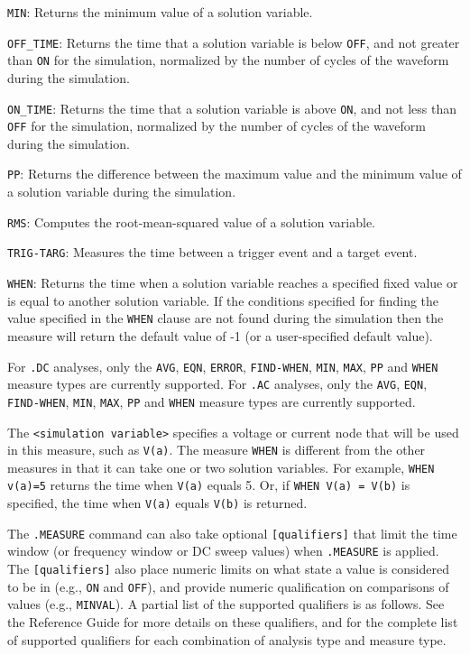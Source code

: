 \begin{XyceItemize}
  \item \texttt{MIN}: Returns the minimum value of a solution variable.
  \item \texttt{OFF\_TIME}: Returns the time that a solution variable is below \texttt{OFF}, and not
    greater than \texttt{ON} for the simulation, normalized by the number of cycles
of the waveform during the simulation.
  \item \texttt{ON\_TIME}: Returns the time that a solution variable is above \texttt{ON}, and not
    less than \texttt{OFF} for the simulation, normalized by the number of cycles
of the waveform during the simulation.
  \item \texttt{PP}: Returns the difference between the maximum value and the minimum value of
    a solution variable during the simulation.
  \item \texttt{RMS}: Computes the root-mean-squared value of a solution variable.
  \item \texttt{TRIG-TARG}: Measures the time between a trigger event and a target event.
  \item \texttt{WHEN}: Returns the time when a solution variable reaches a specified fixed 
    value or is equal to another solution variable.  If the conditions specified for
    finding the value specified in the \texttt{WHEN} clause are not found during the simulation 
    then the measure will return the default value of -1 (or a user-specified default value).
\end{XyceItemize}

For \texttt{.DC} analyses, only the \texttt{AVG}, \texttt{EQN}, \texttt{ERROR}, \texttt{FIND-WHEN},
\texttt{MIN}, \texttt{MAX}, \texttt{PP} and \texttt{WHEN} measure types are currently supported.
For \texttt{.AC} analyses, only the \texttt{AVG}, \texttt{EQN}, \texttt{FIND-WHEN}, \texttt{MIN},
\texttt{MAX}, \texttt{PP} and \texttt{WHEN} measure types are currently supported.

The \texttt{<simulation variable>} specifies a voltage or current node that
will be used in this measure, such as \texttt{V(a)}.  The measure \texttt{WHEN}
is different from the other measures in that it can take one or two solution
variables. For example, \texttt{WHEN v(a)=5} returns the time when
\texttt{V(a)} equals 5.  Or, if \texttt{WHEN V(a) = V(b)} is specified, the
time when \texttt{V(a)} equals \texttt{V(b)} is returned.

The \texttt{.MEASURE} command can also take optional \texttt{[qualifiers]} that
limit the time window (or frequency window or DC sweep values) when \texttt{.MEASURE} is 
applied. The \texttt{[qualifiers]} also place numeric limits on what state a value is
considered to be in (e.g., \texttt{ON} and \texttt{OFF}), and provide numeric
qualification on comparisons of values (e.g., \texttt{MINVAL}).  A partial list of the supported
qualifiers is as follows.  See the \Xyce{} Reference Guide\ReferenceGuide{} for more details
on these qualifiers, and for the complete list of supported qualifiers for each combination
of analysis type and measure type.

